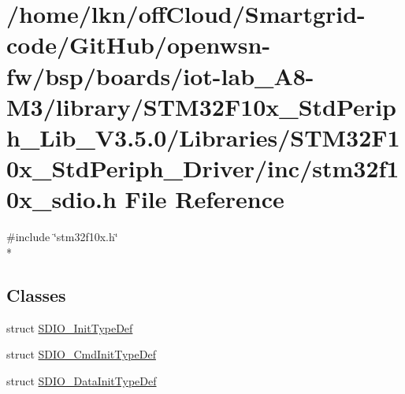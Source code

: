 \hypertarget{iot-lab___a8-_m3_2library_2_s_t_m32_f10x___std_periph___lib___v3_85_80_2_libraries_2_s_t_m32_f10e0d8e4df279ff893440a40099cc0e48d}{}\section{/home/lkn/off\+Cloud/\+Smartgrid-\/code/\+Git\+Hub/openwsn-\/fw/bsp/boards/iot-\/lab\+\_\+\+A8-\/\+M3/library/\+S\+T\+M32\+F10x\+\_\+\+Std\+Periph\+\_\+\+Lib\+\_\+\+V3.5.0/\+Libraries/\+S\+T\+M32\+F10x\+\_\+\+Std\+Periph\+\_\+\+Driver/inc/stm32f10x\+\_\+sdio.h File Reference}
\label{iot-lab___a8-_m3_2library_2_s_t_m32_f10x___std_periph___lib___v3_85_80_2_libraries_2_s_t_m32_f10e0d8e4df279ff893440a40099cc0e48d}
{\ttfamily \#include \char`\"{}stm32f10x.\+h\char`\"{}}\\*
\subsection*{Classes}
\begin{DoxyCompactItemize}
\item 
struct \hyperlink{struct_s_d_i_o___init_type_def}{S\+D\+I\+O\+\_\+\+Init\+Type\+Def}
\item 
struct \hyperlink{struct_s_d_i_o___cmd_init_type_def}{S\+D\+I\+O\+\_\+\+Cmd\+Init\+Type\+Def}
\item 
struct \hyperlink{struct_s_d_i_o___data_init_type_def}{S\+D\+I\+O\+\_\+\+Data\+Init\+Type\+Def}
\end{DoxyCompactItemize}
